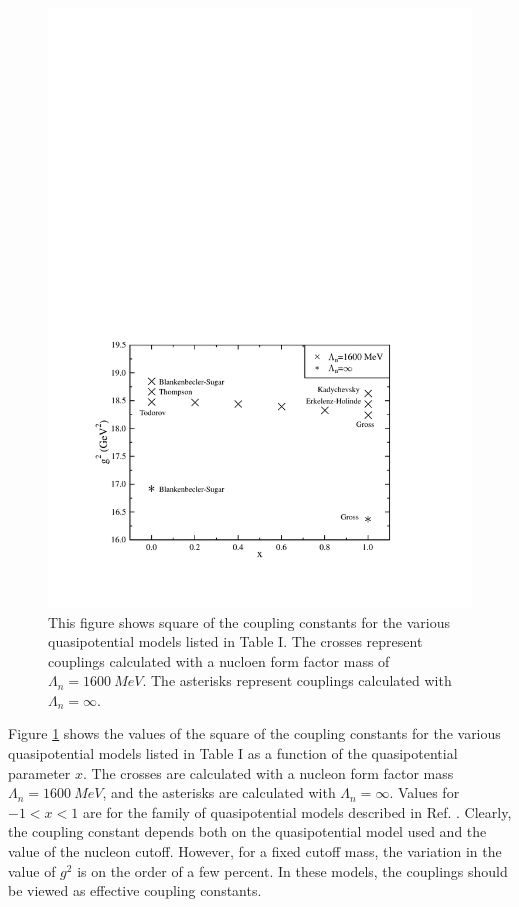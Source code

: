 \documentclass[mythesis.tex]{subfiles}
\begin{document}
\begin{figure}
\centerline{\includegraphics[width=4.5in]{graphics/coupling.pdf}}
\caption{This figure shows square of the coupling constants for the
various quasipotential
models listed in Table I. The crosses represent couplings calculated
with a nucloen form factor mass of $\Lambda_n=1600~MeV$. The asterisks
represent couplings calculated with $\Lambda_n=\infty$.}\label{couplings}
\end{figure}


Figure \ref{couplings} shows the values of the square of the coupling
constants for the various quasipotential models listed in Table I as a
function of the quasipotential parameter $x$. The
crosses are calculated with a nucleon form factor mass $\Lambda_n=1600~MeV$,
and the asterisks are calculated with $\Lambda_n=\infty$. Values for
$-1<x<1$ are for the family of quasipotential models described in
Ref. \cite{GrossB}. Clearly, the coupling constant depends both on the quasipotential
model used and the value of the nucleon cutoff. However, for a fixed cutoff
mass, the variation in the value of $g^2$ is on the order of a few percent.
In these models, the couplings should be viewed as effective coupling
constants.
%
\end{document}
